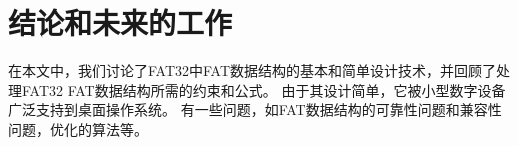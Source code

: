 \chapter{结论和未来的工作}
在本文中，我们讨论了FAT32中FAT数据结构的基本和简单设计技术，并回顾了处理FAT32 FAT数据结构所需的约束和公式。 由于其设计简单，它被小型数字设备广泛支持到桌面操作系统。 有一些问题，如FAT数据结构的可靠性问题和兼容性问题，优化的算法等。
